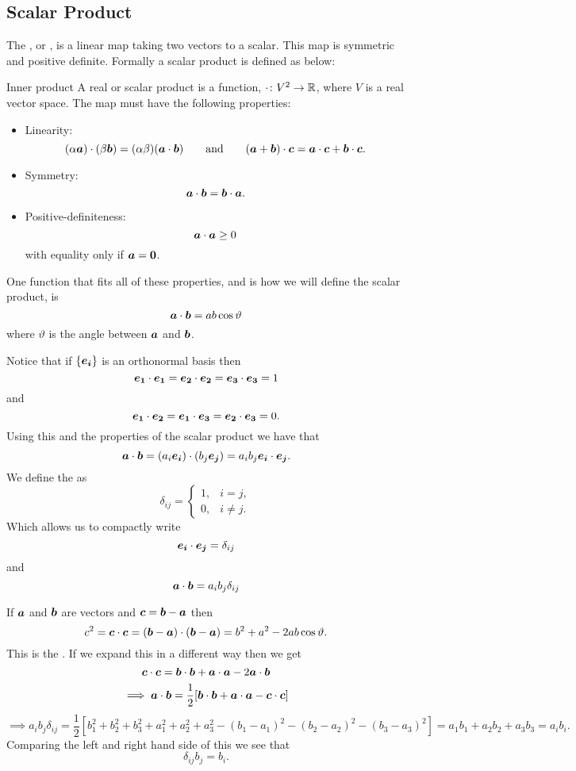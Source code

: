 \subsection{Scalar Product}
The , or , is a linear map taking two vectors to a scalar.
This map is symmetric and positive definite.
Formally a scalar product is defined as below:
\begin{definition}{Inner product}{}
    A real  or scalar product is a function, \(\cdot\colon V^2 \to \mathbb{R}\), where \(V\) is a real vector space.
    The map must have the following properties:
    \begin{itemize}
        \item Linearity:
        \[(\alpha\bm{a})\cdot(\beta\bm{b}) = (\alpha\beta)(\bm{a}\cdot\bm{b})\qquad\text{and}\qquad (\bm{a} + \bm{b})\cdot\bm{c} = \bm{a}\cdot\bm{c} + \bm{b}\cdot\bm{c}.\]
        \item Symmetry:
        \[\bm{a}\cdot\bm{b} = \bm{b}\cdot\bm{a}.\]
        \item Positive-definiteness:
        \[\bm{a}\cdot\bm{a} \ge 0\]
        with equality only if \(\bm{a} = \bm{0}\).
    \end{itemize}
    One function that fits all of these properties, and is how we will define the scalar product, is
    \[\bm{a}\cdot\bm{b} = ab\cos\vartheta\]
    where \(\vartheta\) is the angle between \(\bm{a}\) and \(\bm{b}\).
\end{definition}
Notice that if \(\{\bm{e_{i}}\}\) is an orthonormal basis then
\[\bm{e_{1}}\cdot\bm{e_{1}} = \bm{e_{2}}\cdot\bm{e_{2}} = \bm{e_{3}}\cdot\bm{e_{3}} = 1\]
and 
\[\bm{e_{1}}\cdot\bm{e_{2}} = \bm{e_{1}}\cdot\bm{e_{3}} = \bm{e_{2}}\cdot\bm{e_{3}} = 0.\]
Using this and the properties of the scalar product we have that
\[\bm{a}\cdot\bm{b} = (a_i\bm{e_{i}})\cdot(b_j\bm{e_{j}}) = a_ib_j\bm{e_{i}}\cdot\bm{e_{j}}.\]
We define the  as
\[
\delta_{ij} = 
\begin{cases}
    1, & i = j,\\
    0, & i \ne j.
\end{cases}
\]
Which allows us to compactly write
\[\bm{e_{i}}\cdot\bm{e_{j}} = \delta_{ij}\]
and
\[\bm{a}\cdot\bm{b} = a_ib_j\delta_{ij}\]

If \(\bm{a}\) and \(\bm{b}\) are vectors and \(\bm{c} = \bm{b} - \bm{a}\) then
\[c^2 = \bm{c}\cdot\bm{c} = (\bm{b} - \bm{a})\cdot(\bm{b} - \bm{a}) = b^2 + a^2 - 2ab\cos\vartheta.\]
This is the .
If we expand this in a different way then we get
\[\bm{c}\cdot\bm{c} = \bm{b}\cdot\bm{b} + \bm{a}\cdot\bm{a} - 2\bm{a}\cdot\bm{b}\]
\[\implies \bm{a}\cdot\bm{b} = \frac{1}{2}[\bm{b}\cdot\bm{b} + \bm{a}\cdot\bm{a} - \bm{c}\cdot\bm{c}]\]
\[\implies a_ib_j\delta_{ij} = \frac{1}{2}[b_1^2 + b_2^2 + b_3^2 + a_1^2 + a_2^2 + a_3^2 - (b_1 - a_1)^2 - (b_2 - a_2)^2 - (b_3 - a_3)^2] = a_1b_1 + a_2b_2 + a_3b_3 = a_ib_i.\]
Comparing the left and right hand side of this we see that
\[\delta_{ij}b_j = b_i.\] 

